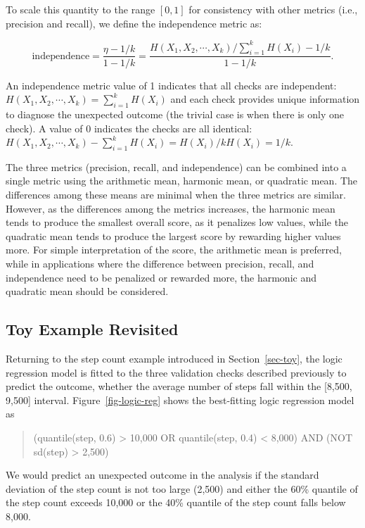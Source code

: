 \documentclass[
  12pt,
]{interact}
\begin{document}
To scale this quantity to the range \([0,1]\) for consistency with other
metrics (i.e., precision and recall), we define the independence metric
as:

\[\text{independence} = \frac{\eta - 1/k}{1 - 1/k}= \frac{H(X_1, X_2, \cdots, X_k)/\sum_{i= 1}^k H(X_i) - 1/k}{1 - 1/k}.\]

An independence metric value of 1 indicates that all checks are
independent: \(H(X_1, X_2, \cdots, X_k)=\sum_{i= 1}^k H(X_i)\) and each
check provides unique information to diagnose the unexpected outcome
(the trivial case is when there is only one check). A value of 0
indicates the checks are all identical:
\(H(X_1, X_2, \cdots, X_k)- \sum_{i= 1}^k H(X_i) = H(X_i)/ k H(X_i) = 1/k\).

The three metrics (precision, recall, and independence) can be combined
into a single metric using the arithmetic mean, harmonic mean, or
quadratic mean. The differences among these means are minimal when the
three metrics are similar. However, as the differences among the metrics
increases, the harmonic mean tends to produce the smallest overall
score, as it penalizes low values, while the quadratic mean tends to
produce the largest score by rewarding higher values more. For simple
interpretation of the score, the arithmetic mean is preferred, while in
applications where the difference between precision, recall, and
independence need to be penalized or rewarded more, the harmonic and
quadratic mean should be considered.

\subsection{Toy Example Revisited}\label{toy-example-revisited}

Returning to the step count example introduced in Section~\ref{sec-toy},
the logic regression model is fitted to the three validation checks
described previously to predict the outcome, whether the average number
of steps fall within the {[}8,500, 9,500{]} interval.
Figure~\ref{fig-logic-reg} shows the best-fitting logic regression model
as

\begin{quote}
(quantile(step, 0.6) \textgreater{} 10,000 OR quantile(step, 0.4)
\textless{} 8,000) AND (NOT sd(step) \textgreater{} 2,500)
\end{quote}

We would predict an unexpected outcome in the analysis if the standard
deviation of the step count is not too large (2,500) and either the 60\%
quantile of the step count exceeds 10,000 or the 40\% quantile of the
step count falls below 8,000.
\end{document}
